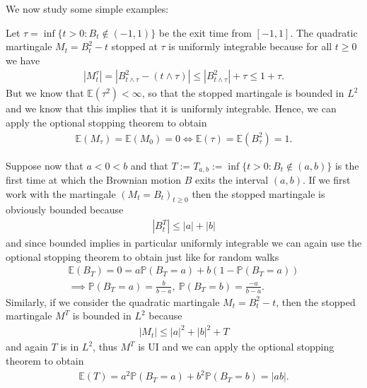 \documentclass[../mainfile.tex]{subfiles}
\begin{document}
We now study some simple examples:
\begin{exmp} Let $\tau = \inf  \{ t >0 : B_t \notin (-1,1)\}$ be the exit time from $[-1,1]$. The quadratic martingale $M_t= B_t^2-t$ stopped at $\tau$ is uniformly integrable because for all $t \geq 0$ we have 
\begin{align*}
|M_t^\tau| = | B_{t \wedge \tau}^2 - ( t \wedge \tau) | \leq |B_{t \wedge \tau}^2| + \tau \leq 1 + \tau.
\end{align*}
But we know that $\mathbb{E}( \tau^2) < \infty$,  so that the stopped martingale is bounded in $L^2$ and we know that this implies that it is uniformly integrable. Hence, we can apply the optional stopping theorem to obtain 
\begin{align*}
\mathbb{E}( M_\tau)= \mathbb{E}( M_0)=0 \iff \mathbb{E}( \tau) = \mathbb{E}(B_\tau^2) =1. 
\end{align*}
\end{exmp}
\begin{exmp} Suppose now that $a<0<b$ and that $T:=T_{a,b}:= \inf \{ t >0 : B_t \notin (a,b)\}$ is the first time at which the Brownian motion $B$ exits the interval $(a,b)$. If we first work with the martingale $(M_t=B_t)_{t \geq 0}$ then the stopped martingale is obviously bounded because
\begin{align*}
|B_t^T| \leq |a|+|b|
\end{align*}
and since bounded implies in particular uniformly integrable we can again use the optional stopping theorem to obtain just like for random walks 
\begin{align*}
\mathbb{E}(B_T)=0= a \mathbb{P}(B_T=a) + b(1- \mathbb{P}(B_T=a)) \\
\implies \mathbb{P}(B_T=a)= \frac{b}{b-a}, \ \mathbb{P}(B_T=b)= \frac{-a}{b-a}.
\end{align*}
Similarly, if we consider the quadratic martingale $M_t=B_t^2-t$, then the stopped martingale $M^T$ is bounded in $L^2$ because 
\begin{align*}
|M_t| \leq |a|^2 + |b|^2 + T
\end{align*}
and again $T$ is in $L^2$, thus $M^T$ is UI and we can apply the optional stopping theorem to obtain
\begin{align*}
\mathbb{E}(T)=a^2 \mathbb{P}(B_T=a)+ b^2 \mathbb{P}(B_T=b)=|ab|. 
\end{align*}
\end{exmp}
\newpage
\end{document}
